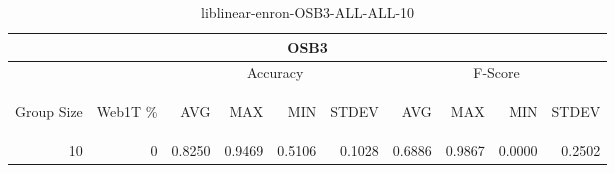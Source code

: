 \begin{center}
\begin{table}[htbp]
\begin{tabular}{ | r | r | r | r | r | r | r | r | r | r |}
\hline
\multicolumn{10}{|c|}{OSB3}\\
\hline
 & & \multicolumn{4}{|c|}{Accuracy} & \multicolumn{4}{|c|}{F-Score}\\ \cline{3-10}
\begin{sideways}Group Size\end{sideways} & \begin{sideways}Web1T \%\end{sideways} & \begin{sideways}AVG\end{sideways} & \begin{sideways}MAX\end{sideways} & \begin{sideways}MIN\end{sideways} & \begin{sideways}STDEV\end{sideways} & \begin{sideways}AVG\end{sideways} & \begin{sideways}MAX\end{sideways} & \begin{sideways}MIN\end{sideways} & \begin{sideways}STDEV\end{sideways}\\
\hline
\multirow{0}{*}{10}
 & 0 & 0.8250 & 0.9469 & 0.5106 & 0.1028 & 0.6886 & 0.9867 & 0.0000 & 0.2502\\ \cline{2-10}
\hline
\end{tabular}
\caption{liblinear-enron-OSB3-ALL-ALL-10}
\label{table:liblinear-enron-OSB3-ALL-ALL-10}
\end{table}
\end{center}

